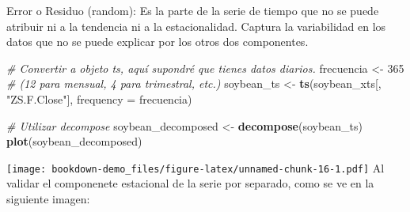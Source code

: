 \documentclass[
]{book}
\newenvironment{Shaded}{\begin{snugshade}}{\end{snugshade}}
\newcommand{\AttributeTok}[1]{\textcolor[rgb]{0.13,0.29,0.53}{#1}}
\newcommand{\CommentTok}[1]{\textcolor[rgb]{0.56,0.35,0.01}{\textit{#1}}}
\newcommand{\DecValTok}[1]{\textcolor[rgb]{0.00,0.00,0.81}{#1}}
\newcommand{\FunctionTok}[1]{\textcolor[rgb]{0.13,0.29,0.53}{\textbf{#1}}}
\newcommand{\NormalTok}[1]{#1}
\newcommand{\OtherTok}[1]{\textcolor[rgb]{0.56,0.35,0.01}{#1}}
\newcommand{\SpecialCharTok}[1]{\textcolor[rgb]{0.81,0.36,0.00}{\textbf{#1}}}
\newcommand{\StringTok}[1]{\textcolor[rgb]{0.31,0.60,0.02}{#1}}
\begin{document}
Error o Residuo (random): Es la parte de la serie de tiempo que no se puede atribuir ni a la tendencia ni a la estacionalidad. Captura la variabilidad en los datos que no se puede explicar por los otros dos componentes.

\begin{Shaded}
\begin{Highlighting}[]
\CommentTok{\# Convertir a objeto ts, aquí supondré que tienes datos diarios.}
\NormalTok{frecuencia }\OtherTok{\textless{}{-}} \DecValTok{365}  \CommentTok{\# (12 para mensual, 4 para trimestral, etc.)}
\NormalTok{soybean\_ts }\OtherTok{\textless{}{-}} \FunctionTok{ts}\NormalTok{(soybean\_xts[, }\StringTok{"ZS.F.Close"}\NormalTok{], }\AttributeTok{frequency =}\NormalTok{ frecuencia)}

\CommentTok{\# Utilizar decompose}
\NormalTok{soybean\_decomposed }\OtherTok{\textless{}{-}} \FunctionTok{decompose}\NormalTok{(soybean\_ts)}
\FunctionTok{plot}\NormalTok{(soybean\_decomposed)}
\end{Highlighting}
\end{Shaded}

\texttt{[image: bookdown-demo\_files/figure-latex/unnamed-chunk-16-1.pdf]}
Al validar el componenete estacional de la serie por separado, como se ve en la siguiente imagen:

\begin{Shaded}
\end{Shaded}
\end{document}
